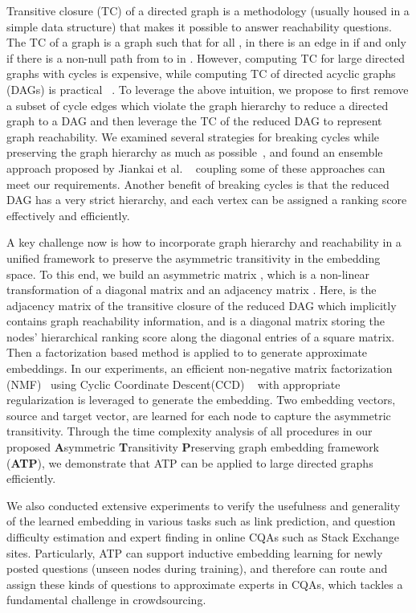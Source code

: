 \documentclass[letterpaper]{article} \usepackage{aaai19}  \usepackage{times}  \usepackage{helvet}  \usepackage{courier}  \usepackage{url}  \usepackage{graphicx}  \usepackage{booktabs} \usepackage{xcolor}
\begin{document}
Transitive closure (TC) of a directed graph is a methodology (usually housed in a simple data structure) that makes it possible to answer reachability questions. The TC of a graph  is a graph  such that for all ,  in  there is an edge  in  if and only if there is a non-null path from  to  in . However, computing TC for large directed graphs with cycles is expensive, while computing TC of directed acyclic graphs (DAGs) is practical ~\cite{SIMON1988325}. To leverage the above intuition, we propose to first remove a subset of cycle edges which violate the graph hierarchy to reduce a directed graph to a DAG and then leverage the TC of the reduced DAG to represent graph reachability. We examined several strategies for breaking cycles while preserving the graph hierarchy as much as possible~\cite{trueskill2007,tatti2015}, and found an ensemble approach proposed by Jiankai et al. ~\cite{Sun2017} coupling some of these approaches can meet our requirements. Another benefit of breaking cycles is that the reduced DAG has a very strict hierarchy, and each vertex can be assigned a ranking score effectively and efficiently. 



A key challenge now is how to incorporate graph hierarchy and reachability in a unified framework to preserve the asymmetric transitivity in the embedding space. To this end, we build an asymmetric matrix , which is a non-linear transformation of a diagonal matrix  and an adjacency matrix . Here,  is the adjacency matrix of the transitive closure of the reduced DAG which implicitly contains graph reachability information, and  is a diagonal matrix storing the nodes' hierarchical ranking score along the diagonal entries of a square matrix. Then a factorization based method is applied to  to generate approximate embeddings. In our experiments, an efficient non-negative matrix factorization (NMF)~\cite{Cheng2017LRA} using Cyclic Coordinate Descent(CCD) ~\cite{Nisa2017} with appropriate regularization is leveraged to generate the embedding. Two embedding vectors, source and target vector, are learned for each node to capture the asymmetric transitivity. Through the time complexity analysis of all procedures in our proposed {\bf A}symmetric {\bf T}ransitivity {\bf P}reserving graph embedding framework ({\bf ATP}), we demonstrate that ATP can be applied to large directed graphs efficiently. 

We also conducted extensive experiments to verify the usefulness and generality of the learned embedding in various tasks such as link prediction, and question difficulty estimation and expert finding in online CQAs such as Stack Exchange sites. Particularly, ATP can support inductive embedding learning for newly posted questions (unseen nodes during training), and therefore can route and assign these kinds of questions to approximate experts in CQAs, which tackles a fundamental challenge in crowdsourcing. 
\end{document}
